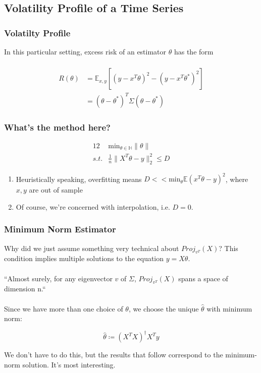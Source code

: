 \documentclass[pdf]{beamer}
\begin{document}
\subsection{Volatility Profile of a Time Series}
\begin{frame}
\frametitle{Volatilty Profile}
In this particular setting, excess risk of an estimator $\theta$ has the form \\~\\

\begin{align*}
 R(\theta) & = \mathbb{E}_{x,y}[ (y-x^{T}\theta)^{2} -  (y-x^{T}\theta^{*})^{2}] \\
& = (\theta - \theta^{*})^{T}\Sigma(\theta - \theta^{*})
\end{align*}


\end{frame}

\begin{frame}
\frametitle{What's the method here?}
    \begin{alignat*}{12}
    & \text{min}_{\theta \in \mathbb{H}}\|\theta\| \\
     s.t. & \frac{1}{n}\|X^{T}\theta - y\|^{2}_{2} \leq D
    \end{alignat*}


\begin{enumerate}
\item<3-4> Heuristically speaking, overfitting means $D << \text{min}_{\theta}\mathbb{E}(x^{T}\theta - y)^{2} $, where $x, y$ are out of sample
\item<4-4> Of course, we're concerned with interpolation, i.e. $D=0$.
\end{enumerate}

\end{frame}

\begin{frame}
\frametitle{Minimum Norm Estimator}

Why did we just assume something very technical about $Proj_{v^{T}}(X)$?  This condition implies multiple solutions to the equation $y = X\theta$.
\\~\\


``Almost surely, for any eigenvector $v$ of $\Sigma$, $Proj_{v^{T}}(X)$ spans a space of dimension n.`` \\~\\

Since we have more than one choice of $\theta$, we choose the unique $\hat\theta$ with minimum norm:

\[ \hat\theta \coloneqq (X^{T}X)^{\dagger}X^{T}y \]

  We don't have to do this, but the results that follow correspond to the minimum-norm solution.  It's most interesting. \\~\\


\end{frame}
\end{document}
